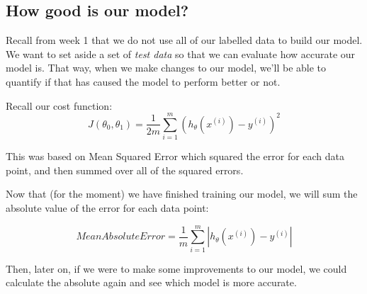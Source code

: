 \documentclass[11pt]{article}
\begin{document}
    \subsection{How good is our model?}
    
Recall from week 1 that we do not use all of our labelled data to build our model. We want to set aside a set of \textit{test data} so that we can evaluate how accurate our model is. That way, when we make changes to our model, we'll be able to quantify if that has caused the model to perform better or not. 

Recall our cost function:
\[J(\theta_0, \theta_1) = \frac{1}{2m} \sum^m_{i=1}(h_\theta(x^{(i)}) - y^{(i)})^2\]

This was based on Mean Squared Error which squared the error for each data point, and then summed over all of the squared errors.

Now that (for the moment) we have finished training our model, we will sum the absolute value of the error for each data point:

\[MeanAbsoluteError = \frac{1}{m} \sum^m_{i=1}|h_\theta(x^{(i)}) - y^{(i)}|\]

Then, later on, if we were to make some improvements to our model, we could calculate the absolute again and see which model is more accurate. 
\end{document}
